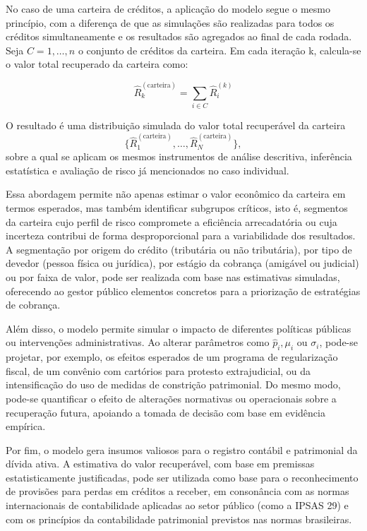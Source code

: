 \documentclass[a4paper,12pt]{article}
\begin{document}
No caso de uma carteira de créditos, a aplicação do modelo segue o mesmo princípio, com a diferença de que as simulações são realizadas para todos os créditos simultaneamente e os resultados são agregados ao final de cada rodada. Seja 
$C={1,…,n}$ o conjunto de créditos da carteira. Em cada iteração k, calcula-se o valor total recuperado da carteira como:

\[ \hat{R}_k^{(\text{carteira})} = \sum_{i \in C} \hat{R}_i^{(k)} \]
 
O resultado é uma distribuição simulada do valor total recuperável da carteira 
\[\{ \hat{R}_1^{(\text{carteira})}, \dots, \hat{R}_N^{(\text{carteira})} \},\]
sobre a qual se aplicam os mesmos instrumentos de análise descritiva, inferência estatística e avaliação de risco já mencionados no caso individual.

Essa abordagem permite não apenas estimar o valor econômico da carteira em termos esperados, mas também identificar subgrupos críticos, isto é, segmentos da carteira cujo perfil de risco compromete a eficiência arrecadatória ou cuja incerteza contribui de forma desproporcional para a variabilidade dos resultados. A segmentação por origem do crédito (tributária ou não tributária), por tipo de devedor (pessoa física ou jurídica), por estágio da cobrança (amigável ou judicial) ou por faixa de valor, pode ser realizada com base nas estimativas simuladas, oferecendo ao gestor público elementos concretos para a priorização de estratégias de cobrança.

Além disso, o modelo permite simular o impacto de diferentes políticas públicas ou intervenções administrativas. Ao alterar parâmetros como 
$\hat{p}_{i}, \mu_{i}$ ou $\sigma_{i}$, pode-se projetar, por exemplo, os efeitos esperados de um programa de regularização fiscal, de um convênio com cartórios para protesto extrajudicial, ou da intensificação do uso de medidas de constrição patrimonial. Do mesmo modo, pode-se quantificar o efeito de alterações normativas ou operacionais sobre a recuperação futura, apoiando a tomada de decisão com base em evidência empírica.

Por fim, o modelo gera insumos valiosos para o registro contábil e patrimonial da dívida ativa. A estimativa do valor recuperável, com base em premissas estatisticamente justificadas, pode ser utilizada como base para o reconhecimento de provisões para perdas em créditos a receber, em consonância com as normas internacionais de contabilidade aplicadas ao setor público (como a IPSAS 29) e com os princípios da contabilidade patrimonial previstos nas normas brasileiras.
\end{document}
